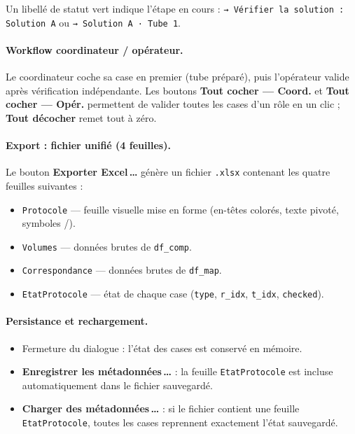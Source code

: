 \documentclass[12pt, a4paper]{article}
\begin{document}
Un libellé de statut vert indique l'étape en cours :
\texttt{→ Vérifier la solution : Solution~A} ou \texttt{→ Solution~A · Tube~1}.

\paragraph{Workflow coordinateur / opérateur.}
Le coordinateur coche sa case en premier (tube préparé), puis l'opérateur
valide après vérification indépendante.
Les boutons \textbf{Tout cocher — Coord.} et \textbf{Tout cocher — Opér.}
permettent de valider toutes les cases d'un rôle en un clic ;
\textbf{Tout décocher} remet tout à zéro.

\paragraph{Export : fichier unifié (4 feuilles).}
Le bouton \textbf{Exporter Excel\,\ldots} génère un fichier \texttt{.xlsx}
contenant les quatre feuilles suivantes :

\begin{itemize}
  \item \texttt{Protocole} — feuille visuelle mise en forme (en-têtes colorés,
        texte pivoté, symboles /).
  \item \texttt{Volumes} — données brutes de \texttt{df\_comp}.
  \item \texttt{Correspondance} — données brutes de \texttt{df\_map}.
  \item \texttt{EtatProtocole} — état de chaque case
        (\texttt{type}, \texttt{r\_idx}, \texttt{t\_idx}, \texttt{checked}).
\end{itemize}

\paragraph{Persistance et rechargement.}
\begin{itemize}
  \item Fermeture du dialogue : l'état des cases est conservé en mémoire.
  \item \textbf{Enregistrer les métadonnées\,\ldots} : la feuille
        \texttt{EtatProtocole} est incluse automatiquement dans le fichier
        sauvegardé.
  \item \textbf{Charger des métadonnées\,\ldots} : si le fichier contient
        une feuille \texttt{EtatProtocole}, toutes les cases reprennent
        exactement l'état sauvegardé.
\end{itemize}
\end{document}
